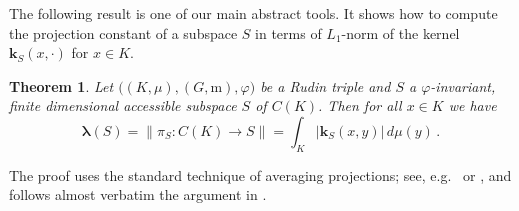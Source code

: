 \documentclass[12pt]{amsart}
\numberwithin{subsection}{section}
\newtheorem{theorem}{Theorem}[section]
\theoremstyle{definition}
\theoremstyle{remark}
\begin{document}
The following result is one of our main abstract tools. It shows how to compute the projection constant of a subspace $S$ in terms of $L_1$-norm of  the kernel $\mathbf{k}_S(x,\cdot)$ for  $x\in K$.





\begin{theorem} \label{main-ibk}
Let $\big((K,\mu),(G,\mathrm{m}),\varphi\big)$ be a Rudin triple and  $S$  a $\varphi$-invariant, finite dimensional accessible subspace $S$ of $C(K)$. Then
  for all $x \in K$ we have \[
\boldsymbol{\lambda}(S) =  \big\|\pi_S:C(K) \to S\big\|=\int_{K }|\mathbf{k}_S(x,y) |\,d\mu(y) \,.
\]
\end{theorem}


The proof uses the standard technique of averaging projections; see, e.g.~\cite{rudin1962projections} or \cite[Theorem III.B.13]{wojtaszczyk1996banach}, and follows almost verbatim the argument in \cite[Theorem 3.1]{defant2024minimal}.



 

\end{document}
